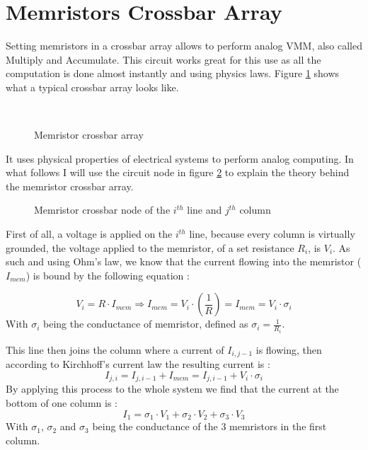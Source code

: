 \section{Memristors Crossbar Array}\label{sec:crossbar}

Setting memristors in a crossbar array allows to perform analog \ac{VMM}, also called Multiply and Accumulate. This circuit works great for this use as all the computation is done almost instantly and using physics laws. Figure \ref{fig:crossbar} shows what a typical crossbar array looks like.

\begin{figure}[H]
  \centering
  \hfill
  \\
  \caption{Memristor crossbar array}
  \label{fig:crossbar}
\end{figure}

It uses physical properties of electrical systems to perform analog computing. In what follows I will use the circuit node in figure \ref{fig:crossNode} to explain the theory behind the memristor crossbar array.
\begin{figure}[H]
  \centering
  
  \caption{Memristor crossbar node of the $i^{th}$ line and $j^{th}$ column}
  \label{fig:crossNode}
\end{figure}

First of all, a voltage is applied on the $i^{th}$ line, because every column is virtually grounded, the voltage applied to the memristor, of a set resistance $R_i$, is $V_i$. As such and using Ohm's law, we know that the current flowing into the memristor ($I_{mem}$) is bound by the following equation :

\begin{equation}
  V_i = R\cdot I_{mem} \Rightarrow I_{mem} = V_i\cdot (\frac{1}{R})=I_{mem} = V_i\cdot\sigma_i
\end{equation}
With $\sigma_i$ being the conductance of memristor, defined as $\sigma_i=\frac{1}{R_i}$.

This line then joins the column where a current of $I_{i,j-1}$ is flowing, then according to Kirchhoff's current law the resulting current is :
\begin{equation}
  I_{j,i} = I_{j,i-1}+I_{mem} = I_{j,i-1} + V_i\cdot\sigma_i
\end{equation}
By applying this process to the whole system we find that the current at the bottom of one column is :
\begin{equation}
  I_1=\sigma_1\cdot V_1 + \sigma_2\cdot V_2 + \sigma_3\cdot V_3
\end{equation}
With $\sigma_1$, $\sigma_2$ and $\sigma_3$ being the conductance of the 3 memristors in the first column.

